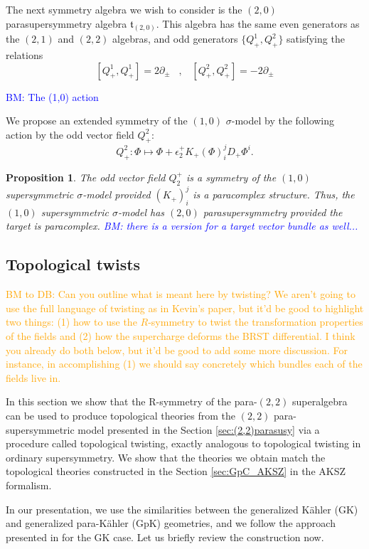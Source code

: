 \documentclass{article}
\newtheorem{proposition}[theorem]{Proposition}
\theoremstyle{definition}
\theoremstyle{remark}
\def\brian{\textcolor{blue}{BM: }\textcolor{blue}}
\def\btd{\textcolor{orange}{BM to DB: }\textcolor{orange}}
\begin{document}
The next symmetry algebra we wish to consider is the $(2,0)$ parasupersymmetry algebra $\mathfrak{t}_{(2,0)}$. 
This algebra has the same even generators as the $(2,1)$ and $(2,2)$ algebras, and odd generators $\{Q^1_+, Q^2_+\}$ satisfying the relations
\[
[Q^1_+, Q^1_+] =  2 \partial_\pm \;\;\; , \;\;\; [Q^2_+, Q^2_+] = - 2 \partial_\pm
\]

\brian{The (1,0) action}

We propose an extended symmetry of the $(1,0)$ $\sigma$-model by the following action by the odd vector field $Q_+^2$:
\[
Q^2_+ : \Phi \mapsto \Phi + \epsilon_2^+ K_+(\Phi)^j_i D_+ \Phi^i .
\]

\begin{proposition}
The odd vector field $Q_2^+$ is a symmetry of the $(1,0)$ supersymmetric $\sigma$-model provided $(K_+)^{j}_i$ is a paracomplex structure. 
Thus, the $(1,0)$ supersymmetric $\sigma$-model has $(2,0)$ parasupersymmetry provided the target is paracomplex. \brian{there is a version for a target vector bundle as well...}
\end{proposition}

\subsection{Topological twists}\label{sec:toptwist}

\btd{Can you outline what is meant here by twisting? We aren't going to use the full language of twisting as in Kevin's paper, but it'd be good to highlight two things: (1) how to use the $R$-symmetry to twist the transformation properties of the fields and (2) how the supercharge deforms the BRST differential.
I think you already do both below, but it'd be good to add some more discussion. 
For instance, in accomplishing (1) we should say concretely which bundles each of the fields live in.}

In this section we show that the R-symmetry of the para-$(2,2)$ superalgebra can be used to produce topological theories from the $(2,2)$ para-supersymmetric model presented in the Section \ref{sec:(2,2)parasusy} via a procedure called topological twisting, exactly analogous to topological twisting in ordinary supersymmetry. We show that the theories we obtain match the topological theories constructed in the Section \ref{sec:GpC_AKSZ} in the AKSZ formalism. 

In our presentation, we use the similarities between the generalized K\"{a}hler (GK) and generalized para-K\"{a}hler (GpK) geometries, and we follow the approach presented in \cite{Kapustin:2004gv} for the GK case. Let us briefly review the construction now.
\end{document}
